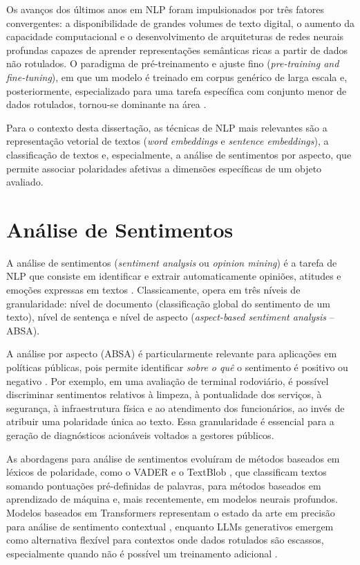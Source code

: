 Os avanços dos últimos anos em NLP foram impulsionados por três fatores convergentes:
a disponibilidade de grandes volumes de texto digital, o aumento da capacidade computacional
e o desenvolvimento de arquiteturas de redes neurais profundas capazes de aprender
representações semânticas ricas a partir de dados não rotulados. O paradigma de
pré-treinamento e ajuste fino (\textit{pre-training and fine-tuning}), em que um modelo é treinado em
corpus genérico de larga escala e, posteriormente, especializado para uma tarefa específica com
conjunto menor de dados rotulados,  tornou-se dominante na área \cite{devlin2019}.

Para o contexto desta dissertação, as técnicas de NLP mais relevantes são a representação
vetorial de textos (\textit{word embeddings} e \textit{sentence embeddings}), a classificação de textos e,
especialmente, a análise de sentimentos por aspecto, que permite associar polaridades afetivas a
dimensões específicas de um objeto avaliado.

\section{Análise de Sentimentos}
\label{sec:analise-sentimentos}

A análise de sentimentos (\textit{sentiment analysis} ou \textit{opinion mining}) é a tarefa de NLP
que consiste em identificar e extrair automaticamente opiniões, atitudes e emoções expressas em
textos \cite{liu2023b}. Classicamente, opera em três níveis de granularidade: nível de
documento (classificação global do sentimento de um texto), nível de sentença e nível de aspecto
(\textit{aspect-based sentiment analysis} -- ABSA).

A análise por aspecto (\gls{ABSA}) é particularmente relevante para aplicações em políticas
públicas, pois permite identificar \emph{sobre o quê} o sentimento é positivo ou negativo
\cite{wankhade2022}. Por exemplo, em uma avaliação de terminal rodoviário, é possível
discriminar sentimentos relativos à limpeza, à pontualidade dos serviços, à segurança, à
infraestrutura física e ao atendimento dos funcionários, ao invés de atribuir uma polaridade
única ao texto. Essa granularidade é essencial para a geração de diagnósticos acionáveis voltados
a gestores públicos.

As abordagens para análise de sentimentos evoluíram de métodos baseados em léxicos de
polaridade, como o \gls{VADER} \cite{hutto2014} e o TextBlob \cite{loria2018}, que classificam
textos somando pontuações pré-definidas de palavras, para métodos baseados em aprendizado
de máquina e, mais recentemente, em modelos neurais profundos. Modelos baseados em
Transformers representam o estado da arte em precisão para análise de sentimento contextual
\cite{wankhade2022}, enquanto \gls{LLM}s generativos emergem como alternativa flexível para
contextos onde dados rotulados são escassos, especialmente quando não é possível um treinamento adicional \cite{agua2025,larosa2025}.

